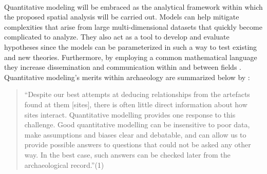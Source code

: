 \documentclass[12pt,a4paper]{thesis}
\begin{document}
\paragraph{}
Quantitative modeling will be embraced as the analytical framework within which the proposed spatial 
analysis will be carried out. Models can help mitigate complexities that arise from large multi-dimensional datasets that quickly become complicated to analyze. They also act as a tool to develop and evaluate hypotheses since the models can be parameterized in such a way to test existing and new theories. Furthermore, by employing a common mathematical language they increase dissemination and communication within and between fields \citep{Wyl09}. Quantitative modeling's merits within archaeology are summarized below by \citep{ERK12}:

\begin{singlespace}
\begin{quote}
        ``Despite our best attempts at deducing relationships from the artefacts found at them [sites], there is often little direct information about how sites interact. Quantitative modelling provides one response to this challenge. Good quantitative modelling can be insensitive to poor data, make assumptions and biases clear and debatable, and can allow us to provide possible answers to questions that could not be asked any other way. In the best case, such answers can be checked later from the archaeological record.''(1)
\end{quote}
\end{singlespace}
\end{document}

